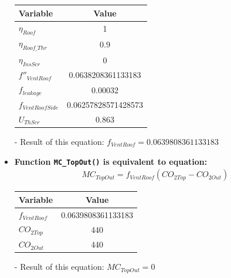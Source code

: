 \documentclass[a4paper]{article}
\numberwithin{equation}{section}
\begin{document}
\begin{itemize}
        \begin{table}[H]
          \centering
          \begin{tabular}{@{}lS[table-format=1.17]@{}}
            \toprule
            \textbf{Variable}    & \textbf{Value}      \\
            \midrule
            \(\eta_{Roof}\)      & 1                   \\
            \(\eta_{Roof\_Thr}\) & 0.9                 \\
            \(\eta_{InsScr}\)    & 0                   \\
            \(f''_{VentRoof}\)   & 0.0638208361133183  \\
            \(f_{leakage}\)      & 0.00032             \\
            \(f_{VentRoofSide}\) & 0.06257828571428573 \\
            \(U_{ThScr}\)        & 0.863               \\
            \bottomrule
          \end{tabular}
        \end{table}

  \item[-] Result of this equation: \(f_{VentRoof} = 0.0639808361133183\)

  \item \textbf{Function \texttt{MC\_TopOut()} is equivalent to equation:}
        \begin{align*}
          MC_{TopOut} = f_{VentRoof}(CO_{2 Top} - CO_{2 Out})
        \end{align*}

        \begin{table}[H]
          \centering
          \begin{tabular}{@{}lS@{}}
            \toprule
            \textbf{Variable} & \textbf{Value}     \\
            \midrule
            \(f_{VentRoof}\)  & 0.0639808361133183 \\
            \(CO_{2 Top}\)    & 440                \\
            \(CO_{2 Out}\)    & 440                \\
            \bottomrule
          \end{tabular}
        \end{table}

  \item[-] Result of this equation: \( MC_{TopOut} = 0 \)


\end{itemize}
\end{document}
